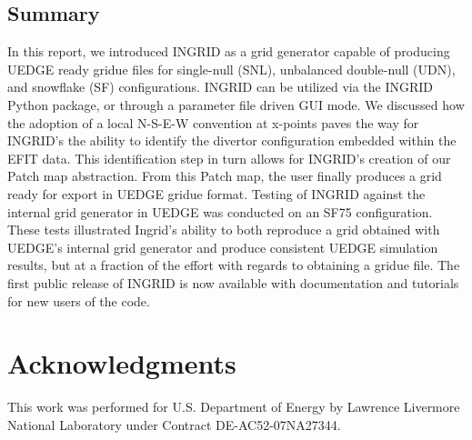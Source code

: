 \subsection{\label{sec:level2}Summary}
In this report, we introduced INGRID as a grid generator capable of producing UEDGE ready gridue files for single-null (SNL), unbalanced double-null (UDN), and snowflake (SF) configurations. INGRID can be utilized via the INGRID Python package, or through a parameter file driven GUI mode. We discussed how the adoption of a local N-S-E-W convention at x-points paves the way for INGRID's the ability to identify the divertor configuration embedded within the EFIT data. This identification step in turn allows for INGRID's creation of our Patch map abstraction. From this Patch map, the user finally produces a grid ready for export in UEDGE gridue format. Testing of INGRID against the internal grid generator in UEDGE was conducted on an SF75 configuration. These tests illustrated Ingrid's ability to both reproduce a grid obtained with UEDGE's internal grid generator and produce consistent UEDGE simulation results, but at a fraction of the effort with regards to obtaining a gridue file. The first public release of INGRID is now available with documentation and tutorials for new users of the code.

\section{Acknowledgments}
This work was performed for U.S. Department of Energy by Lawrence Livermore National Laboratory under Contract DE-AC52-07NA27344.